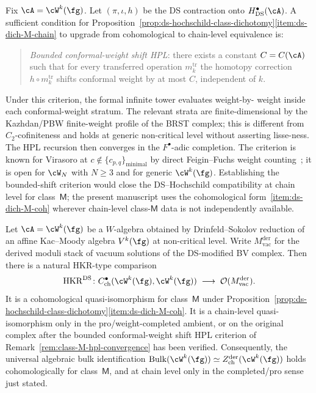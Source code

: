 \begin{remark}%
\label{rem:class-M-hpl-convergence}%
%
Fix $\cA=\cW^k(\fg)$. Let $(\pi,\iota,h)$ be the DS contraction onto
$H^\bullet_{\mathrm{DS}}(\cA)$. A sufficient condition for
Proposition~\ref{prop:ds-hochschild-class-dichotomy}\ref{item:ds-dich-M-chain}
to upgrade from cohomological to chain-level equivalence is:
\begin{quote}
\emph{Bounded conformal-weight shift HPL}: there exists a constant
$C=C(\cA)$ such that for every transferred operation
$m_k^{\mathrm{tr}}$ the homotopy correction $h\circ m_k^{\mathrm{tr}}$
shifts conformal weight by at most $C$, independent of $k$.
\end{quote}
Under this criterion, the formal infinite tower evaluates weight-by-
weight inside each conformal-weight stratum.  The relevant strata are
finite-dimensional by the Kazhdan/PBW finite-weight profile of the
BRST complex; this is different from \(C_2\)-cofiniteness and holds
at generic non-critical level without asserting lisse-ness.  The HPL
recursion then converges in the $F^\bullet$-adic completion. The
criterion is known for Virasoro at
$c\notin\{c_{p,q}\}_{\mathrm{minimal}}$ by direct Feigin--Fuchs weight
counting~\cite{FeiginFuchs90}; it is open for
$\cW_N$ with $N\ge 3$ and for generic $\cW^k(\fg)$. Establishing the
bounded-shift criterion would close the DS--Hochschild compatibility
at chain level for class~$\mathsf{M}$; the present manuscript uses the
cohomological form~\ref{item:ds-dich-M-coh} wherever chain-level
class-$\mathsf{M}$ data is not independently available.
\end{remark}

\begin{theorem}%
\label{thm:ds-hochschild-bridge}%
%
%
%
Let $\cA=\cW^k(\fg)$ be a $W$-algebra obtained by Drinfeld--Sokolov
reduction of an affine Kac--Moody algebra $V^k(\fg)$ at non-critical
level. Write $M_{\mathrm{vac}}^{\mathrm{der}}$ for the derived moduli
stack of vacuum solutions of the DS-modified BV complex.
Then there is a natural HKR-type comparison
\[
\mathrm{HKR}^{\mathrm{DS}}\colon
C^\bullet_{\mathrm{ch}}(\cW^k(\fg),\cW^k(\fg))
\;\longrightarrow\;
\mathcal{O}(M_{\mathrm{vac}}^{\mathrm{der}}).
\]
It is a cohomological quasi-isomorphism for class~$\mathsf M$ under
Proposition~\ref{prop:ds-hochschild-class-dichotomy}\ref{item:ds-dich-M-coh}.
It is a chain-level quasi-isomorphism only in the pro/weight-completed
ambient, or on the original complex after the bounded conformal-weight
shift HPL criterion of
Remark~\ref{rem:class-M-hpl-convergence} has been verified.
Consequently, the universal algebraic bulk identification
$\mathrm{Bulk}(\cW^k(\fg))\simeq Z^{\mathrm{der}}_{\mathrm{ch}}(\cW^k(\fg))$
holds cohomologically for class~$\mathsf M$, and at chain level only
in the completed/pro sense just stated.
\end{theorem}

